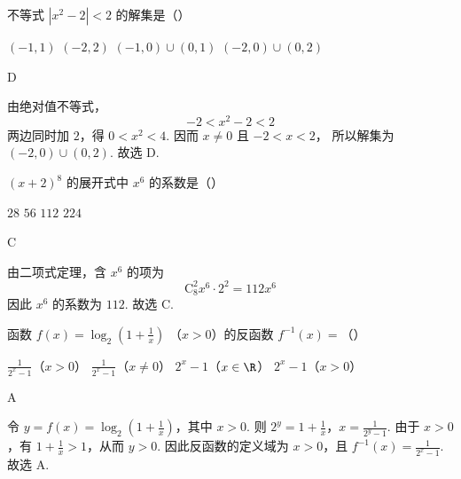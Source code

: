 \begin{problem}
不等式 \( |x^2 - 2| < 2 \) 的解集是（\quad）

\choices
    {\((-1, 1)\)}
    {\((-2, 2)\)}
    {\((-1,0)\cup (0,1)\)}
    {\((-2,0)\cup (0,2)\)}

\begin{answer}
D
\end{answer}

\begin{solution}
由绝对值不等式，
\[
-2<x^2-2<2
\]
两边同时加 \(2\)，得 \(0<x^2<4\). 因而 \(x\ne0\) 且 \(-2<x<2\)，
所以解集为 \((-2,0)\cup(0,2)\). 故选 D.
\end{solution}
\end{problem}

\begin{problem}
\((x + 2)^{8}\) 的展开式中 \(x^{6}\) 的系数是（\quad）

\choices
    {\(28\)}
    {\(56\)}
    {\(112\)}
    {\(224\)}

\begin{answer}
C
\end{answer}

\begin{solution}
由二项式定理，含 \(x^6\) 的项为
\[
\mathrm C_8^2x^6\cdot2^2=112x^6
\]
因此 \(x^6\) 的系数为 \(112\). 故选 C.
\end{solution}
\end{problem}

\begin{problem}
函数 \( f(x) = \log_2\left(1 + \frac{1}{x}\right)  \) （\(x > 0\)）的反函数 \( f^{-1}(x) = \)（\quad）

\choices
    {\(\frac{1}{2^{x} - 1} \)（\(x > 0\)）}
    {\(\frac{1}{2^{x} - 1} \)（\(x\neq 0\)）}
    {\(2^{x} - 1 \)（\(x \in \R\)）}
    {\(2^{x} - 1 \)（\(x > 0\)）}

\begin{answer}
A
\end{answer}

\begin{solution}
令 \(y=f(x)=\log_2\left(1+\frac{1}{x}\right)\)，其中 \(x>0\). 则
\(2^y=1+\frac{1}{x}\)，\(x=\frac{1}{2^y-1}\).
由于 \(x>0\)，有 \(1+\frac{1}{x}>1\)，从而 \(y>0\). 因此反函数的定义域为 \(x>0\)，且
\(f^{-1}(x)=\frac{1}{2^x-1}\). 故选 A.
\end{solution}
\end{problem}

